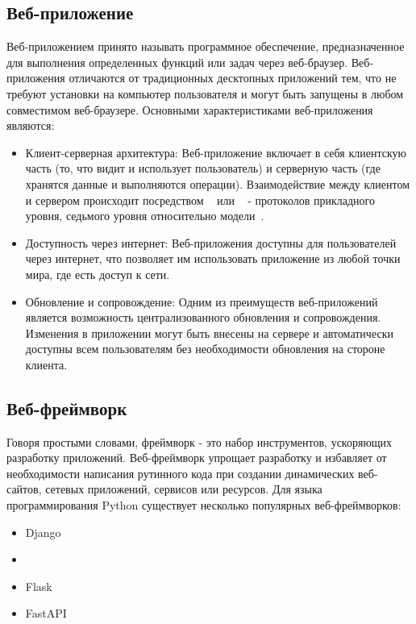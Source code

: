 \subsection{Веб-приложение}
Веб-приложением принято называть программное обеспечение, предназначенное для выполнения определенных функций или задач через веб-браузер.
Веб-приложения отличаются от традиционных десктопных приложений тем, что не требуют установки на компьютер пользователя и могут быть запущены в любом совместимом веб-браузере.
Основными характеристиками веб-приложения являются:
\begin{itemize}
    \item Клиент-серверная архитектура:
    Веб-приложение включает в себя клиентскую часть (то, что видит и использует пользователь) и серверную часть (где хранятся данные и выполняются операции).
    Взаимодействие между клиентом и сервером происходит посредством
    ~ или
    ~
    - протоколов прикладного уровня, седьмого уровня относительно модели~.
    \item Доступность через интернет:
    Веб-приложения доступны для пользователей через интернет, что позволяет им использовать приложение из любой точки мира, где есть доступ к сети.
    \item Обновление и сопровождение:
    Одним из преимуществ веб-приложений является возможность централизованного обновления и сопровождения.
    Изменения в приложении могут быть внесены на сервере и автоматически доступны всем пользователям без необходимости обновления на стороне клиента.
\end{itemize}

\subsection{Веб-фреймворк}
Говоря простыми словами, фреймворк - это набор инструментов, ускоряющих разработку приложений.
Веб-фреймворк упрощает разработку и избавляет от необходимости написания рутинного кода при создании
динамических веб-сайтов, сетевых приложений, сервисов или ресурсов.
Для языка программирования Python существует несколько популярных веб-фреймворков:
\begin{itemize}
    \item Django
    \item {}
    \item Flask
    \item FastAPI
\end{itemize}

